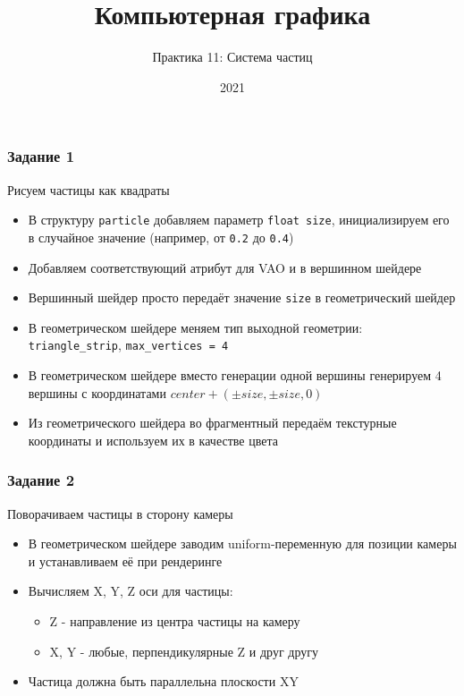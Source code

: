 \documentclass{beamer}
\title{Компьютерная графика}
\subtitle{Практика 11: Система частиц}
\date{2021}
\begin{document}
\frame{\titlepage}

\begin{frame}[fragile]
\frametitle{Задание 1}
Рисуем частицы как квадраты
\begin{itemize}
\item В структуру \verb|particle| добавляем параметр \verb|float size|, инициализируем его в случайное значение (например, от \verb|0.2| до \verb|0.4|)
\pause
\item Добавляем соответствующий атрибут для VAO и в вершинном шейдере
\pause
\item Вершинный шейдер просто передаёт значение \verb|size| в геометрический шейдер
\pause
\item В геометрическом шейдере меняем тип выходной геометрии: \verb|triangle_strip|, \verb|max_vertices = 4|
\pause
\item В геометрическом шейдере вместо генерации одной вершины генерируем 4 вершины с координатами \begin{math}center + (\pm size, \pm size, 0)\end{math}
\pause
\item Из геометрического шейдера во фрагментный передаём текстурные координаты и используем их в качестве цвета
\end{itemize}
\end{frame}

\begin{frame}[fragile]
\frametitle{Задание 2}
Поворачиваем частицы в сторону камеры
\begin{itemize}
\item В геометрическом шейдере заводим uniform-переменную для позиции камеры и устанавливаем её при рендеринге
\pause
\item Вычисляем X, Y, Z оси для частицы:
\begin{itemize}
\item Z - направление из центра частицы на камеру
\item X, Y - любые, перпендикулярные Z и друг другу
\end{itemize}
\pause
\item Частица должна быть параллельна плоскости XY
\end{itemize}
\end{frame}
\end{document}
